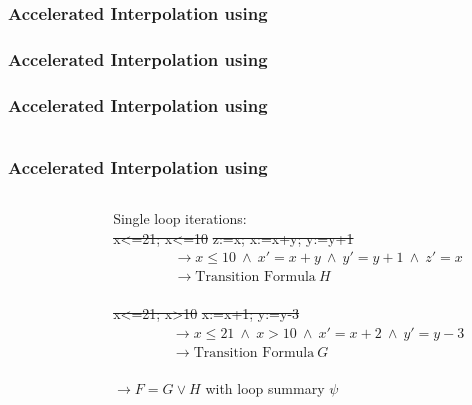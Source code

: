 \begin{frame}[t]
	\frametitle{Accelerated Interpolation using \qvasr}
	\resizebox{\textwidth}{!}{}
\end{frame}

\begin{frame}[t]
	\frametitle{Accelerated Interpolation using \qvasr}
	\resizebox{0.5\textwidth}{!}{}
\end{frame}

\begin{frame}[t]
	\frametitle{Accelerated Interpolation using \qvasr}
	\begin{columns}
		\begin{column}{0.35\textwidth}
			\resizebox{0.8\textwidth}{!}{}
		\end{column}
		\begin{column}{0.55\textwidth}
			\onslide<2-5>
			\resizebox{0.4\textwidth}{!}{}
		\end{column}
	\end{columns}
\end{frame}

\begin{frame}[t]
	\frametitle{Accelerated Interpolation using \qvasr}
	\begin{columns}
		\begin{column}{0.35\textwidth}
			\resizebox{0.8\textwidth}{!}{}
		\end{column}
		\begin{column}{0.55\textwidth}
			Single loop iterations: \vspace*{0.25cm}\\
			\st{x<=21; x<=10} \st{z:=x; x:=x+y; y:=y+1}
			\onslide<2->
			{\small 
			\begin{align*}
			&\rightarrow x \leq 10\ \land\ x' = x + y\ \land\ y' = y + 1\ \land\ z' = x \\
			&\rightarrow \text{Transition Formula}\ H 
			\end{align*}
			}%
			\onslide<1-> \\
			\vspace*{1cm}\st{x<=21; x>10} \st{x:=x+1; y:=y-3}
			\onslide<2->
			\begin{align*}
			&\rightarrow	x \leq 21\ \land\ x > 10\ \land\ x' = x + 2\ \land\ y' = y -3 \\
			&\rightarrow \text{Transition Formula}\ G
			\end{align*}
			\onslide<3-> \\
			\vspace*{1cm}
			$\rightarrow F = G \lor H$ \onslide<4-> with loop summary \color<4->{emblue} $\psi$
		\end{column}
	\end{columns}
\end{frame}

